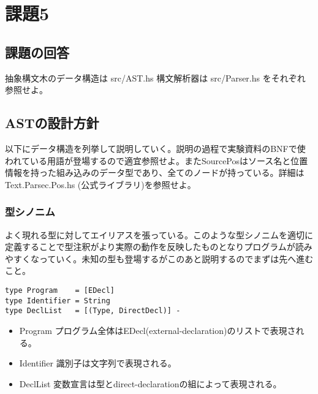 \documentclass{jsarticle}
\begin{document}
\section{課題5}
\subsection{課題の回答}
抽象構文木のデータ構造は src/AST.hs 構文解析器は src/Parser.hs をそれぞれ参照せよ。

\subsection{ASTの設計方針}
以下にデータ構造を列挙して説明していく。説明の過程で実験資料のBNFで使われている用語が登場するので適宜参照せよ。またSourcePosはソース名と位置情報を持った組み込みのデータ型であり、全てのノードが持っている。詳細は Text.Parsec.Pos.hs (公式ライブラリ)を参照せよ。

\subsubsection{型シノニム}
よく現れる型に対してエイリアスを張っている。このような型シノニムを適切に定義することで型注釈がより実際の動作を反映したものとなりプログラムが読みやすくなっていく。未知の型も登場するがこのあと説明するのでまずは先へ進むこと。
\begin{verbatim}
type Program    = [EDecl]
type Identifier = String
type DeclList   = [(Type, DirectDecl)] -
\end{verbatim}
\begin{itemize}
\item Program プログラム全体はEDecl(external-declaration)のリストで表現される。
\item Identifier 識別子は文字列で表現される。
\item DeclList 変数宣言は型とdirect-declarationの組によって表現される。
\end{itemize}
\end{document}

